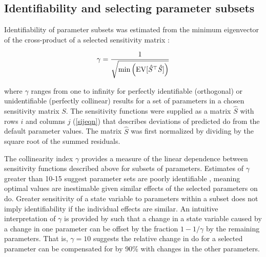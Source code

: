 \documentclass[letterpaper,12pt,oneside]{article}\usepackage[]{graphicx}\usepackage[]{color}
\begin{document}
\subsection{Identifiability and selecting parameter subsets}

Identifiability of parameter subsets was estimated from the minimum eigenvector of the cross-product of a selected sensitivity matrix \citep{Brun01,Omlin01}:

\begin{equation}
\gamma = \frac{1} {\sqrt{ \min \left(\rm{EV}[\mathit{\hat{S}}^\top \mathit{\hat{S}}]\right)}}
\end{equation}

\noindent where $\gamma$ ranges from one to infinity for perfectly identifiable (orthogonal) or unidentifiable (perfectly collinear) results for a set of parameters in a chosen sensitivity matrix $S$.  The sensitivity functions were supplied as a matrix $\hat{S}$ with rows $i$ and columns $j$ (\cref{sijeqn}) that describes deviations of predicted \ac{do} from the default parameter values.  The matrix $\hat{S}$ was first normalized by dividing by the square root of the summed residuals\citep{Omlin01,Soetaert10}. 

The collinearity index $\gamma$ provides a measure of the linear dependence between sensitivity functions described above for subsets of parameters. Estimates of $\gamma$ greater than 10-15 suggest parameter sets are poorly identifiable \citep{Brun01,Omlin01}, meaning optimal values are inestimable given similar effects of the selected parameters on \ac{do}. Greater sensitivity of a state variable to parameters within a subset does not imply identifiability if the individual effects are similar.  An intuitive interpretation of $\gamma$ is provided by \citet{Brun01} such that a change in a state variable caused by a change in one parameter can be offset by the fraction $1 - 1/\gamma$ by the remaining parameters.  That is, $\gamma = 10$ suggests the relative change in \ac{do} for a selected parameter can be compensated for by 90\% with changes in the other parameters. 
\end{document}
